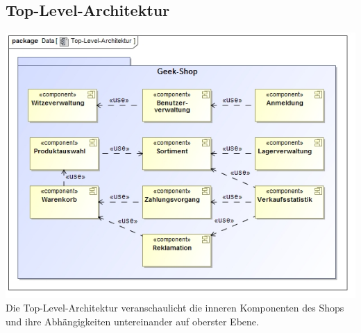 \documentclass[pdftex,12pt,a4paper]{article}
\begin{document}
\subsection*{Top-Level-Architektur}
\includegraphics[width=1\textwidth]{./images/toplevelarchitektur}
Die Top-Level-Architektur veranschaulicht die inneren Komponenten des Shops und ihre Abh\"angigkeiten untereinander auf oberster Ebene.
\end{document}
